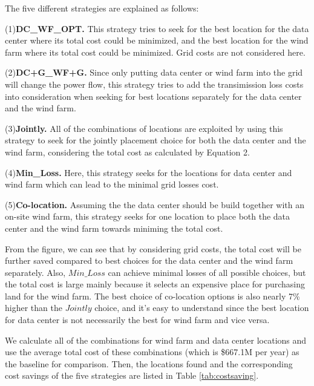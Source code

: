 The five different strategies are explained as follows:

(1)\textbf{DC\_WF\_OPT.} This strategy tries to seek for the best location for the data center where its total cost could be minimized, and the best location for the wind farm where its total cost could be minimized.  Grid costs are not considered here.

(2)\textbf{DC+G\_WF+G.} Since only putting data center or wind farm into the grid will change the power flow, this strategy tries to add the transimission loss costs into consideration when seeking for best locations separately for the data center and the wind farm.

(3)\textbf{Jointly.} All of the combinations of locations are exploited by using this strategy to seek for the jointly placement choice for both the data center and the wind farm, considering the total cost as calculated by Equation 2.

(4)\textbf{Min\_Loss.} Here, this strategy seeks for the locations for data center and wind farm which can lead to the minimal grid losses cost.

(5)\textbf{Co-location.} Assuming the the data center should be build together with an on-site wind farm, this strategy seeks for one location to place both the data center and the wind farm towards miniming the total cost.

From the figure, we can see that by considering grid costs, the total cost will be further saved compared to best choices for the data center and the wind farm separately. Also, $Min\_Loss$ can achieve minimal losses of all possible choices, but the total cost is large mainly because it selects an expensive place for purchasing land for the wind farm. The best choice of co-location options is also nearly 7\% higher than the $Jointly$ choice, and it's easy to understand since the best location for data center is not necessarily the best for wind farm and vice versa.

We calculate all of the combinations for wind farm and data center locations and use the average total cost of these combinations (which is \$667.1M per year) as the baseline for comparison. Then, the locations found and the corresponding cost savings of the five strategies are listed in Table \ref{tab:costsaving}. 

